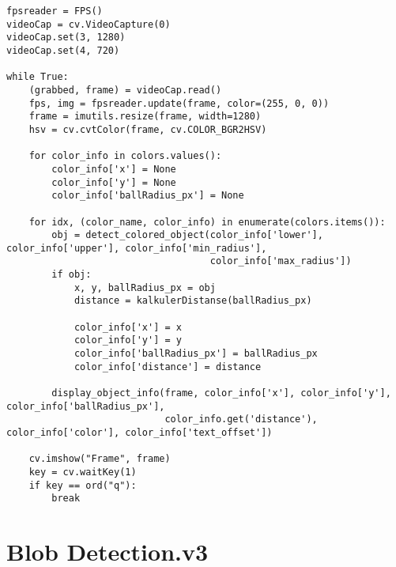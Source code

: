 \begin{lstlisting}[language=PythonPlus]
fpsreader = FPS() 
videoCap = cv.VideoCapture(0) 
videoCap.set(3, 1280)
videoCap.set(4, 720)

while True:
    (grabbed, frame) = videoCap.read() 
    fps, img = fpsreader.update(frame, color=(255, 0, 0)) 
    frame = imutils.resize(frame, width=1280) 
    hsv = cv.cvtColor(frame, cv.COLOR_BGR2HSV) 

    for color_info in colors.values():
        color_info['x'] = None
        color_info['y'] = None
        color_info['ballRadius_px'] = None

    for idx, (color_name, color_info) in enumerate(colors.items()):
        obj = detect_colored_object(color_info['lower'], color_info['upper'], color_info['min_radius'],
                                    color_info['max_radius'])
        if obj: 
            x, y, ballRadius_px = obj 
            distance = kalkulerDistanse(ballRadius_px) 
            
            color_info['x'] = x
            color_info['y'] = y
            color_info['ballRadius_px'] = ballRadius_px
            color_info['distance'] = distance

        display_object_info(frame, color_info['x'], color_info['y'], color_info['ballRadius_px'],
                            color_info.get('distance'), color_info['color'], color_info['text_offset'])

    cv.imshow("Frame", frame)  
    key = cv.waitKey(1)  
    if key == ord("q"):
        break
\end{lstlisting}

\section{Blob Detection.v3}

